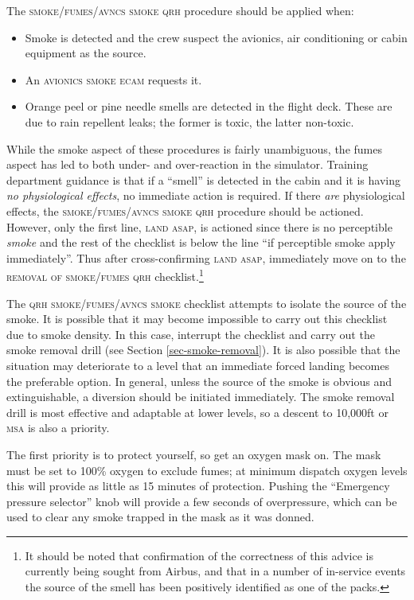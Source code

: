 \documentclass[a5paper,11pt,twoside]{book}
\newcommand{\ac}[1]{{\scshape\MakeLowercase{#1}}}
\newcommand{\cphrase}[1]{\ac{#1}}
\begin{document}
The \cphrase{smoke/fumes/avncs smoke} \ac{QRH} procedure should be applied
when:

\begin{itemize}
\item Smoke is detected and the crew suspect the avionics, air conditioning or
  cabin equipment as the source.
\item An \cphrase{Avionics Smoke} \ac{ECAM} requests it.
\item Orange peel or pine needle smells are detected in the flight deck. These
  are due to rain repellent leaks; the former is toxic, the latter non-toxic.
  \end{itemize}

While the smoke aspect of these procedures is fairly unambiguous, the fumes
aspect has led to both under- and over-reaction in the simulator. Training
department guidance is that if a ``smell'' is detected in the cabin and it is
having \emph{no physiological effects}, no immediate action is required. If
there \emph{are} physiological effects, the \cphrase{SMOKE/FUMES/AVNCS SMOKE}
\ac{QRH} procedure should be actioned. However, only the first line,
\cphrase{LAND ASAP}, is actioned since there is no perceptible \emph{smoke} and
the rest of the checklist is below the line ``if perceptible smoke apply
immediately''. Thus after cross-confirming \cphrase{LAND ASAP}, immediately move
on to the \cphrase{REMOVAL OF SMOKE/FUMES} \ac{QRH} checklist.\footnote{It
should be noted that confirmation of the correctness of this advice is currently
being sought from Airbus, and that in a number of in-service events the source
of the smell has been positively identified as one of the packs.}


The \ac{QRH} \cphrase{SMOKE/FUMES/AVNCS SMOKE} checklist attempts to isolate the
source of the smoke. It is possible that it may become impossible to carry out
this checklist due to smoke density. In this case, interrupt the checklist and
carry out the smoke removal drill (see Section \ref{sec-smoke-removal}). It is
also possible that the situation may deteriorate to a level that an immediate
forced landing becomes the preferable option. In general, unless the source of
the smoke is obvious and extinguishable, a diversion should be initiated
immediately. The smoke removal drill is most effective and adaptable at lower
levels, so a descent to 10,000ft or \ac{MSA} is also a priority.

The first priority is to protect yourself, so get an oxygen mask on. The mask
must be set to 100\% oxygen to exclude fumes; at minimum dispatch oxygen levels
this will provide as little as 15 minutes of protection. Pushing the ``Emergency
pressure selector'' knob will provide a few seconds of overpressure, which can
be used to clear any smoke trapped in the mask as it was donned.
\end{document}
